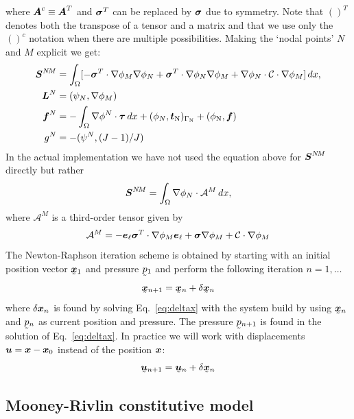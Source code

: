 where $\boldsymbol{A}^c\equiv\boldsymbol{A}^T$ and $\boldsymbol{\sigma}^T$ can be replaced
by $\boldsymbol{\sigma}$ due to symmetry.
Note that $()^T$ denotes both the transpose of
a tensor and a matrix and that we use only the $()^c$ notation
when there are multiple possibilities. Making the `nodal points' $N$ and $M$
explicit we get:
\begin{align*}
   \boldsymbol{S}^{N\!M}&= \int_\Omega[
   -\boldsymbol{\sigma}^T\cdot\nabla\phi_M\nabla\phi_N 
   +\boldsymbol{\sigma}^T\cdot\nabla\phi_N\nabla\phi_M
   +\nabla\phi_N\cdot\mathcal{C}\cdot\nabla\phi_M
 ]\,d x,\\
\boldsymbol{L}^N&=(\psi_N,\nabla\phi_M)\\
 \boldsymbol{f}^N&=-\int_\Omega \nabla\phi^N\cdot\boldsymbol{\tau}\,d x+
          (\phi_N,\boldsymbol{t}_\text{N})_{\Gamma_{\text{N}}}+(\phi_\text{N},\boldsymbol{f})\\
 g^N&=-(\psi^N,(J-1)/J)
\end{align*}
In the actual implementation we have not used the equation above
for $\boldsymbol{S}^{N\!M}$ directly but rather 
\[
   \boldsymbol{S}^{N\!M}= \int_\Omega \nabla\phi_N\cdot\mathcal{A}^M\,d x,
\]
where $\mathcal{A}^M$ is a third-order tensor given by
\[
    \mathcal{A}^M=-\boldsymbol{e}_\ell\boldsymbol{\sigma}^T\cdot\nabla\phi_M\boldsymbol{e}_\ell
                +\boldsymbol{\sigma}\nabla\phi_M+\mathcal{C}\cdot\nabla\phi_M
\]
The Newton-Raphson iteration scheme is obtained by starting with an initial
position vector $\col{\vek x}_1$ and pressure $\col p_1$ and
perform the following iteration $n=1,\dots$
\[
   \col{\vek x}_{n+1} = \col{\vek x}_n + \delta\col{\vek x}_n
\]
where $\delta\boldsymbol{x}_n$ is found by solving Eq.~\eqref{eq:deltax} with the
system build by using $\col{\vek x}_n$ and $\col p_n$ as current position
and pressure. The pressure $\col p_{n+1}$ is found in the solution of
Eq.~\eqref{eq:deltax}. In practice
we will work with displacements $\boldsymbol{u}=\boldsymbol{x}-\boldsymbol{x}_0$ instead of the
position $\boldsymbol{x}$:
\[
   \col{\vek u}_{n+1} = \col{\vek u}_n + \delta\col{\vek x}_n
\]

\subsection{Mooney-Rivlin constitutive model}

